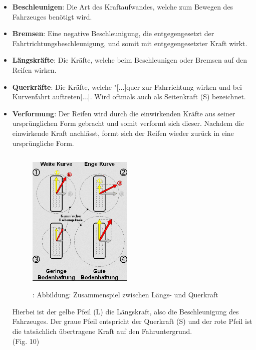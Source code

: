 				\begin{itemize}
					\item \textbf{Beschleunigen}: Die Art des Kraftaufwandes, welche zum Bewegen des Fahrzeuges benötigt wird.
					\item \textbf{Bremsen}: Eine negative Beschleunigung, die entgegengesetzt der Fahrtrichtungsbeschleunigung, und somit mit entgegengesetzter Kraft wirkt.
					\item \textbf{Längskräfte}: Die Kräfte, welche beim Beschleunigen oder Bremsen auf den Reifen wirken.
					\item \textbf{Querkräfte}: Die Kräfte, welche "[...]quer zur Fahrrichtung wirken und bei Kurvenfahrt auftreten[...].\cite{TS_swt} Wird oftmals auch als Seitenkraft (S) bezeichnet.
					\item \textbf{Verformung}: Der Reifen wird durch die einwirkenden Kräfte aus seiner ursprünglichen Form gebracht und somit verformt sich dieser. Nachdem die einwirkende Kraft nachlässt, formt sich der Reifen wieder zurück in eine ursprüngliche Form.
					
					\begin{figure}
						\centering
						\includegraphics[width=5cm, height=7cm] {l_qkraft.png}
						\caption {\cite{TS_l_q_k_pic}: Abbildung: Zusammenspiel zwischen Längs- und Querkraft}
					\end{figure}
				
					Hierbei ist der gelbe Pfeil (L) die Längskraft, also die Beschleunigung des Fahrzeuges.
					Der graue Pfeil entspricht der Querkraft (S) und der rote Pfeil ist die tatsächlich übertragene Kraft auf den Fahruntergrund.\\ (Fig. 10)
					  
				\end{itemize}
					
